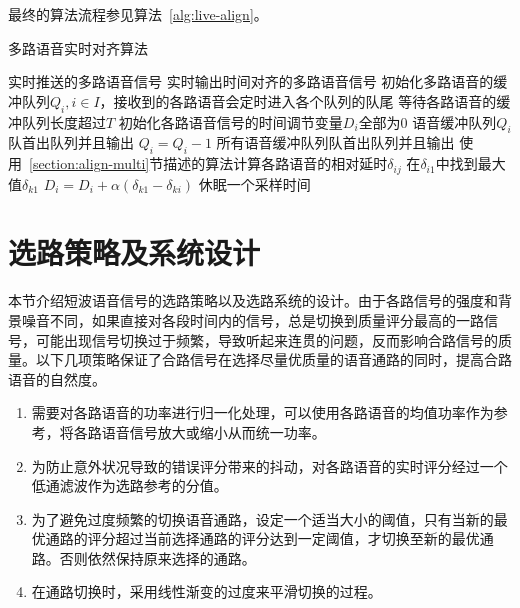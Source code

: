 最终的算法流程参见算法~\ref{alg:live-align}。

\begin{algorithm}
    \caption{多路语音实时对齐算法}
    \label{alg:live-align}
\begin{algorithmic}[1]
\INPUT
    \Statex 实时推送的多路语音信号
\OUTPUT
    \Statex 实时输出时间对齐的多路语音信号
\State 初始化多路语音的缓冲队列$Q_i, i\in I$，接收到的各路语音会定时进入各个队列的队尾
\State 等待各路语音的缓冲队列长度超过$T$
\State 初始化各路语音信号的时间调节变量$D_i$全部为0
            \State 语音缓冲队列$Q_i$队首出队列并且输出
        \Else
            \State $Q_i = Q_i - 1$
        \EndIf
    \EndFor
        \State 所有语音缓冲队列队首出队列并且输出
    \EndIf
        \State 使用~\ref{section:align-multi}节描述的算法计算各路语音的相对延时$\delta_{ij}$
        \State 在$\delta_{i1}$中找到最大值$\delta_{k1}$
            \State $D_i = D_i + \alpha(\delta_{k1}-\delta_{ki})$
        \EndFor
    \EndIf
    \State 休眠一个采样时间
\EndWhile
\end{algorithmic}
\end{algorithm}

\section{选路策略及系统设计}

本节介绍短波语音信号的选路策略以及选路系统的设计。由于各路信号的强度和背景噪音不同，如果直接对各段时间内的信号，总是切换到质量评分最高的一路信号，可能出现信号切换过于频繁，导致听起来连贯的问题，反而影响合路信号的质量。以下几项策略保证了合路信号在选择尽量优质量的语音通路的同时，提高合路语音的自然度。

\begin{enumerate}
    \item 需要对各路语音的功率进行归一化处理，可以使用各路语音的均值功率作为参考，将各路语音信号放大或缩小从而统一功率。
    \item 为防止意外状况导致的错误评分带来的抖动，对各路语音的实时评分经过一个低通滤波作为选路参考的分值。
    \item 为了避免过度频繁的切换语音通路，设定一个适当大小的阈值，只有当新的最优通路的评分超过当前选择通路的评分达到一定阈值，才切换至新的最优通路。否则依然保持原来选择的通路。 
    \item 在通路切换时，采用线性渐变的过度来平滑切换的过程。
\end{enumerate}

